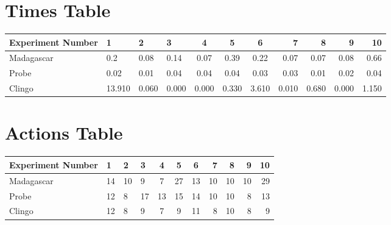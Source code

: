 \documentclass[8pt]{article}
\begin{document}
\begin{landscape}
\section{Times Table}\begin{tabular}{ | l | l | l | l | c | c | c | r | r | r | r | }\hline
Experiment Number & 1 & 2 & 3 & 4 & 5 & 6 & 7 & 8 & 9 & 10\\  \hline
Madagascar & 0.2 & 0.08 & 0.14 & 0.07 & 0.39 & 0.22 & 0.07 & 0.07 & 0.08 & 0.66\\  \hline
Probe & 0.02 & 0.01 & 0.04 & 0.04 & 0.04 & 0.03 & 0.03 & 0.01 & 0.02 & 0.04\\  \hline
Clingo & 13.910 & 0.060 & 0.000 & 0.000 & 0.330 & 3.610 & 0.010 & 0.680 & 0.000 & 1.150\\  \hline
\end{tabular}
\section{Actions Table}\begin{tabular}{ | l | l | l | l | c | c | c | r | r | r | r | }\hline
Experiment Number & 1 & 2 & 3 & 4 & 5 & 6 & 7 & 8 & 9 & 10\\ \hline
 Madagascar & 14 & 10 & 9 & 7 & 27 & 13 & 10 & 10 & 10 & 29\\ \hline
 Probe & 12 & 8 & 17 & 13 & 15 & 14 & 10 & 10 & 8 & 13\\ \hline
 Clingo & 12 & 8 & 9 & 7 & 9 & 11 & 8 & 10 & 8 & 9\\ \hline
\end{tabular}
\end{landscape}
\end{document}
